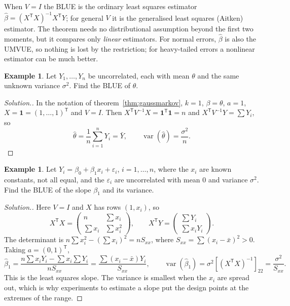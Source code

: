 \documentclass[12pt,a4paper]{report}
\theoremstyle{definition}
\newtheorem{exa}[thm]{Example}
\DeclareMathOperator{\var}{var}
\newenvironment{solution}
  {\renewcommand{\qedsymbol}{}\begin{proof}[\textit{Solution}.]}
  {\end{proof}}
\begin{document}
When $V = I$ the BLUE is the ordinary least squares estimator
$\hat\beta = (X^{\mathsf T}X)^{-1}X^{\mathsf T}Y$; for general $V$ it is the generalised
least squares (Aitken) estimator. The theorem needs no distributional assumption
beyond the first two moments, but it compares only \emph{linear} estimators. For
normal errors, $\hat\beta$ is also the UMVUE, so nothing is lost by the restriction;
for heavy-tailed errors a nonlinear estimator can be much better.

\begin{exa}
\label{ex:blueequal}
Let $Y_1, \dots, Y_n$ be uncorrelated, each with mean $\theta$ and the same unknown
variance $\sigma^2$. Find the BLUE of $\theta$.
\end{exa}

\begin{solution}
In the notation of theorem~\ref{thm:gaussmarkov}, $k = 1$, $\beta = \theta$, $a = 1$,
$X = \mathbf 1 = (1, \dots, 1)^{\mathsf T}$ and $V = I$. Then
$X^{\mathsf T}V^{-1}X = \mathbf 1^{\mathsf T}\mathbf 1 = n$ and
$X^{\mathsf T}V^{-1}Y = \sum Y_i$, so
\[\hat\theta = \frac1n\sum_{i=1}^n Y_i = \bar Y,\qquad \var(\hat\theta) = \frac{\sigma^2}{n} .\]
\end{solution}

\begin{exa}
\label{ex:blueline}
Let $Y_i = \beta_0 + \beta_1x_i + \varepsilon_i$, $i = 1, \dots, n$, where the $x_i$ are
known constants, not all equal, and the $\varepsilon_i$ are uncorrelated with mean $0$
and variance $\sigma^2$. Find the BLUE of the slope $\beta_1$ and its variance.
\end{exa}

\begin{solution}
Here $V = I$ and $X$ has rows $(1, x_i)$, so
\[X^{\mathsf T}X = \begin{pmatrix} n & \sum x_i\\ \sum x_i & \sum x_i^2\end{pmatrix},\qquad
X^{\mathsf T}Y = \begin{pmatrix}\sum Y_i\\ \sum x_iY_i\end{pmatrix}.\]
The determinant is $n\sum x_i^2 - \left(\sum x_i\right)^2 = nS_{xx}$, where
$S_{xx} = \sum (x_i - \bar x)^2>0$. Taking $a = (0, 1)^{\mathsf T}$,
\[\hat\beta_1 = \frac{n\sum x_iY_i - \sum x_i\sum Y_i}{nS_{xx}} = \frac{\sum (x_i - \bar x)Y_i}{S_{xx}},\qquad
\var(\hat\beta_1) = \sigma^2\left[(X^{\mathsf T}X)^{-1}\right]_{22} = \frac{\sigma^2}{S_{xx}} .\]
This is the least squares slope. The variance is smallest when the $x_i$ are spread
out, which is why experiments to estimate a slope put the design points at the
extremes of the range.
\end{solution}
\end{document}

